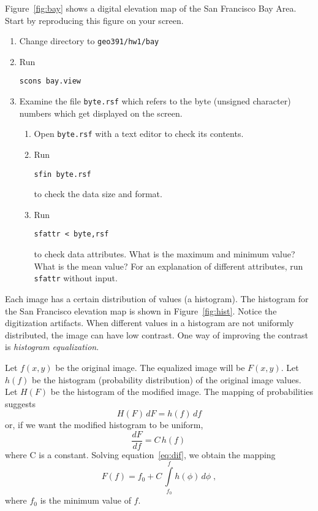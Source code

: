 
Figure~\ref{fig:bay} shows a digital elevation map of the San
Francisco Bay Area. Start by reproducing this figure on your screen.
\begin{enumerate}
\item Change directory to \verb#geo391/hw1/bay#
\item Run
\begin{verbatim}
scons bay.view
\end{verbatim}
\item Examine the file \texttt{byte.rsf} which refers to the 
byte (unsigned character) numbers which get displayed on the screen.
\begin{enumerate}
\item Open \texttt{byte.rsf} with a text editor to check its contents.
\item Run
\begin{verbatim}
sfin byte.rsf
\end{verbatim}
to check the data size and format.
\item Run
\begin{verbatim}
sfattr < byte,rsf
\end{verbatim}
to check data attributes. What is the maximum and minimum value? What is the mean value?
For an explanation of different attributes, run \texttt{sfattr} without input.
\end{enumerate}
\end{enumerate}

Each image has a certain distribution of values (a histogram). The
histogram for the San Francisco elevation map is shown in
Figure~\ref{fig:hist}. Notice the digitization artifacts. When
different values in a histogram are not uniformly distributed, the
image can have low contrast. One way of improving the contrast is
\emph{histogram equalization}.


Let $f(x,y)$ be the original image. The equalized image will be
$F(x,y)$. Let $h(f)$ be the histogram (probability distribution) of
the original image values. Let $H(F)$ be the histogram of the modified
image. The mapping of probabilities suggests
\begin{equation}
\label{eq:prob}
H(F)\,dF = h(f)\,df
\end{equation}
or, if we want the modified histogram
to be uniform, 
\begin{equation}
\label{eq:dif}
\frac{d F}{d f} = C\,h(f)\,
\end{equation}
where C is a constant. 
Solving equation~\ref{eq:dif}, we obtain the mapping
\begin{equation}
\label{eq:int}
F(f) = f_0 + C\,\int\limits_{f_0}^f h(\phi)\,d\phi\;,
\end{equation}
where $f_0$ is the minimum value of $f$.

